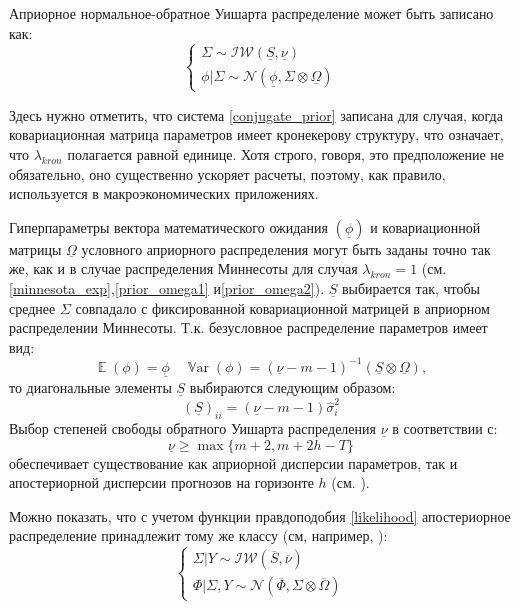\documentclass[11pt]{article} %
\DeclareMathOperator{\E}{\mathbb{E}}
\DeclareMathOperator{\Var}{\mathbb{V}\mathrm{ar}}
\newcommand{\cN}{\mathcal{N}}
\newcommand{\cIW}{\mathcal{IW}}
\newcommand{\prior}{\underline}
\newcommand{\post}{\overline}
\begin{document}
Априорное нормальное-обратное Уишарта распределение может быть записано как:
\begin{equation}
\begin{cases} \label{conjugate_prior}
\Sigma\sim \cIW(\prior S, \prior \nu) \\
\phi|\Sigma\sim \cN (\prior \phi, \Sigma\otimes\prior \Omega)
\end{cases} 
\end{equation}

Здесь нужно отметить, что система \eqref{conjugate_prior} записана для случая, когда ковариационная матрица параметров имеет кронекерову структуру, что означает, что $\lambda_{kron}$ полагается равной единице. Хотя строго, говоря, это предположение не обязательно, оно существенно ускоряет расчеты, поэтому, как правило, используется в макроэкономических  приложениях. 

Гиперпараметры вектора математического ожидания $(\prior \phi)$ и ковариационной матрицы $\prior \Omega$ условного априорного распределения  могут быть заданы точно так же, как и в случае распределения Миннесоты для  случая $\lambda_{kron} =1$ (см. \eqref{minnesota_exp},\eqref{prior_omega1} и\eqref{prior_omega2}). 
$\prior S$ выбирается так, чтобы среднее $\Sigma$ совпадало с фиксированной ковариационной матрицей в априорном распределении Миннесоты. Т.к. безусловное распределение параметров имеет вид:
\begin{equation}
\E(\phi)=\prior \phi \quad \Var(\phi)=(\prior \nu - m -1)^{-1}(\prior S\otimes \prior \Omega),
\end{equation}
то диагональные элементы $\prior S$ выбираются следующим образом:
\begin{equation}
(\prior S)_{ii}= (\prior \nu- m- 1) \hat\sigma^2_{i}
\end{equation}
Выбор степеней свободы обратного Уишарта распределения $\prior\nu$ в соответствии с: 
\begin{equation}
\prior \nu \geq\max\lbrace m+2, m+2h-T\rbrace
\end{equation}
обеспечивает существование как априорной дисперсии параметров, так и апостериорной дисперсии прогнозов на горизонте $h$ (см. \cite{kadiyala_karlsson_1997}).

Можно показать, что с учетом функции правдоподобия \eqref{likelihood} апостериорное распределение принадлежит тому же классу (см, например, \cite{zellner_1996}):
\begin{equation}
\begin{cases}
\Sigma|Y \sim \cIW(\post S, \post \nu) \\
\Phi|\Sigma,Y\sim \cN (\post \Phi, \Sigma\otimes\post \Omega) 
\end{cases}
\end{equation}
\end{document}
